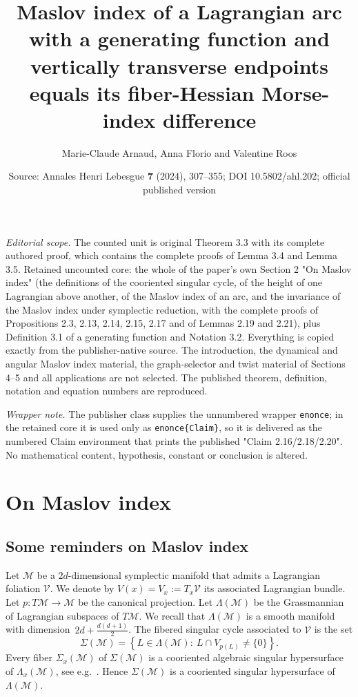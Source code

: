 \documentclass[10pt,a4paper]{amsart}
\title[Generating functions: Maslov index equals fiber-Hessian Morse-index difference]{Maslov index of a Lagrangian arc with a generating function and vertically transverse endpoints equals its fiber-Hessian Morse-index difference}
\author{Marie-Claude Arnaud, Anna Florio and Valentine Roos}
\date{Source: Annales Henri Lebesgue \textbf{7} (2024), 307--355; DOI 10.5802/ahl.202; official published version}
\numberwithin{equation}{section}
\newcommand*\M{\mathcal{M}}
\newcommand*\cv{\mathcal{V}}
\newcommand*\cal{\mathcal}
\theoremstyle{definition}
\theoremstyle{remark}
\begin{document}
\maketitle
\noindent\textit{Editorial scope.} The counted unit is original Theorem 3.3 with its complete authored proof, which contains the complete proofs of Lemma 3.4 and Lemma 3.5. Retained uncounted core: the whole of the paper's own Section 2 "On Maslov index" (the definitions of the cooriented singular cycle, of the height of one Lagrangian above another, of the Maslov index of an arc, and the invariance of the Maslov index under symplectic reduction, with the complete proofs of Propositions 2.3, 2.13, 2.14, 2.15, 2.17 and of Lemmas 2.19 and 2.21), plus Definition 3.1 of a generating function and Notation 3.2. Everything is copied exactly from the publisher-native source. The introduction, the dynamical and angular Maslov index material, the graph-selector and twist material of Sections 4--5 and all applications are not selected. The published theorem, definition, notation and equation numbers are reproduced.\par
\noindent\textit{Wrapper note.} The publisher class supplies the unnumbered wrapper \texttt{enonce}; in the retained core it is used only as \texttt{enonce\{Claim\}}, so it is delivered as the numbered Claim environment that prints the published "Claim 2.16/2.18/2.20". No mathematical content, hypothesis, constant or conclusion is altered.
\setcounter{section}{1}
\section{On Maslov index}\label{section def MI}

\subsection{Some reminders on Maslov index}\label{ssremindersMslov}

Let $\cal M$ be a $2d$-dimensional symplectic manifold that admits a Lagrangian foliation $\cal V$. We denote by $V(x)=V_x:=T_x\cal V$ its associated Lagrangian bundle. Let $p:T\M\rightarrow \cal M$ be the canonical projection. Let $\Lambda(\cal M)$ be the Grassmannian of Lagrangian subspaces of $T\cal M$. We recall that $\Lambda(\cal M)$ is a smooth manifold with dimension~$2d+\frac{d(d+1)}{2}$. The fibered singular cycle associated to $\cv$ is the set
\[
\Sigma(\cal M)=\left\{ L\in \Lambda(\cal M) :\ L\cap V_{p(L)}\not=\{ 0\}\right\}.
\]
Every fiber $\Sigma_x(\cal M)$ of $\Sigma(\cal M)$ is a cooriented algebraic singular hypersurface of $\Lambda_x(\cal M)$, see e.g.~\cite{McDuffSalamon2017,RobbinSalamon1993}. Hence $\Sigma(\cal M)$ is a cooriented singular hypersurface of $\Lambda(\cal M)$.
\end{document}
